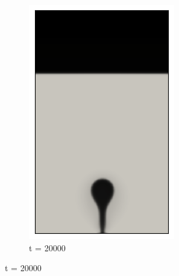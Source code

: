 \begin{figure}[H]
\begin{subfigure}{0.25\textwidth}
		\includegraphics[width=\linewidth]{figs/cap4/cuda_bb_760_d20}
		\caption{t = 20000}
		\label{fig:3}
	\end{subfigure}
	

\end{figure}
